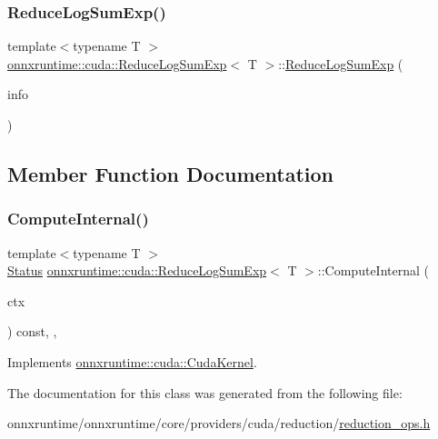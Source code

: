 \subsubsection{\texorpdfstring{Reduce\+Log\+Sum\+Exp()}{ReduceLogSumExp()}}
{\footnotesize\ttfamily template$<$typename T $>$ \\
\mbox{\hyperlink{classonnxruntime_1_1cuda_1_1ReduceLogSumExp}{onnxruntime\+::cuda\+::\+Reduce\+Log\+Sum\+Exp}}$<$ T $>$\+::\mbox{\hyperlink{classonnxruntime_1_1cuda_1_1ReduceLogSumExp}{Reduce\+Log\+Sum\+Exp}} (\begin{DoxyParamCaption}\item[{const \mbox{\hyperlink{classonnxruntime_1_1OpKernelInfo}{Op\+Kernel\+Info}} \&}]{info }\end{DoxyParamCaption})\hspace{0.3cm}{\ttfamily [inline]}}



\subsection{Member Function Documentation}
\mbox{\label{classonnxruntime_1_1cuda_1_1ReduceLogSumExp_a409c23ca08af097ab4af96a222548735}} 
\subsubsection{\texorpdfstring{Compute\+Internal()}{ComputeInternal()}}
{\footnotesize\ttfamily template$<$typename T $>$ \\
\mbox{\hyperlink{classonnxruntime_1_1common_1_1Status}{Status}} \mbox{\hyperlink{classonnxruntime_1_1cuda_1_1ReduceLogSumExp}{onnxruntime\+::cuda\+::\+Reduce\+Log\+Sum\+Exp}}$<$ T $>$\+::Compute\+Internal (\begin{DoxyParamCaption}\item[{\mbox{\hyperlink{classonnxruntime_1_1OpKernelContext}{Op\+Kernel\+Context}} $\ast$}]{ctx }\end{DoxyParamCaption}) const\hspace{0.3cm}{\ttfamily [inline]}, {\ttfamily [override]}, {\ttfamily [virtual]}}



Implements \mbox{\hyperlink{classonnxruntime_1_1cuda_1_1CudaKernel_aca7af04ae448017d6023d30bba231ebb}{onnxruntime\+::cuda\+::\+Cuda\+Kernel}}.



The documentation for this class was generated from the following file\+:\begin{DoxyCompactItemize}
\item 
onnxruntime/onnxruntime/core/providers/cuda/reduction/\mbox{\hyperlink{cuda_2reduction_2reduction__ops_8h}{reduction\+\_\+ops.\+h}}\end{DoxyCompactItemize}
